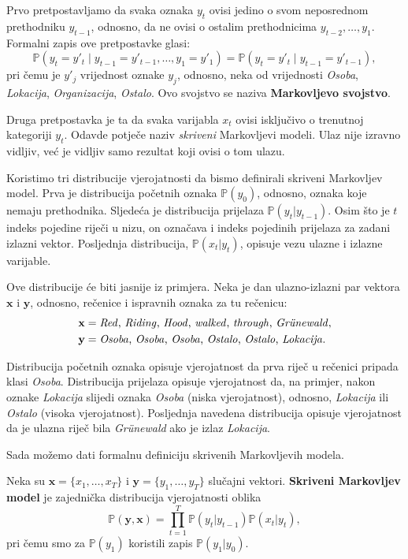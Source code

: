 \documentclass[a4paper,twoside,12pt]{memoir} %
\newcommand{\ti}[1]{\textit{#1\/}}
\newcommand{\tb}{\textbf}
\begin{document}
	Prvo pretpostavljamo da svaka oznaka $y_t$ ovisi jedino o svom neposrednom prethodniku $y_{t-1}$, odnosno, da ne ovisi o ostalim prethodnicima $y_{t-2}, \ldots, y_1$. Formalni zapis ove pretpostavke glasi:
	\begin{equation*}
	\mathbb{P}(y_t=y'_t \mid y_{t-1} = y'_{t-1}, \ldots, y_1 = y'_1) = \mathbb{P}(y_t=y'_t \mid y_{t-1} = y'_{t-1}),
	\end{equation*}
	pri čemu je $y'_j$ vrijednost oznake $y_j$, odnosno, neka od vrijednosti \ti{Osoba}, \ti{Lokacija}, \ti{Organizacija}, \ti{Ostalo}. Ovo svojstvo se naziva \tb{Markovljevo svojstvo}.

	Druga pretpostavka je ta da svaka varijabla $x_t$ ovisi isključivo o trenutnoj kategoriji $y_t$. Odavde potječe naziv \ti{skriveni} Markovljevi modeli. Ulaz nije izravno vidljiv, već je vidljiv samo rezultat koji ovisi o tom ulazu.

	Koristimo tri distribucije vjerojatnosti da bismo definirali skriveni Markovljev model. Prva je distribucija početnih oznaka $\mathbb{P}(y_0)$, odnosno, oznaka koje nemaju prethodnika. Sljedeća je distribucija prijelaza $\mathbb{P}(y_t|y_{t-1})$. Osim što je $t$ indeks pojedine riječi u nizu, on označava i indeks pojedinih prijelaza za zadani izlazni vektor.
	Posljednja distribucija, $\mathbb{P}(x_t|y_t)$, opisuje vezu ulazne i izlazne varijable.

	Ove distribucije će biti jasnije iz primjera. Neka je dan ulazno-izlazni par vektora $\mathbf{x}$ i $\mathbf{y}$, odnosno, rečenice i ispravnih oznaka za tu rečenicu:
	\begin{align*}
	\mathbf{x} &= \text{\ti{Red}, \ti{Riding}, \ti{Hood}, \ti{walked}, \ti{through}, \ti{Grünewald}},\\
	\mathbf{y} &= \text{\ti{Osoba}, \ti{Osoba}, \ti{Osoba}, \ti{Ostalo}, \ti{Ostalo}, \ti{Lokacija}}.
	\end{align*}

	Distribucija početnih oznaka opisuje vjerojatnost da prva riječ u rečenici pripada klasi \ti{Osoba}. Distribucija prijelaza opisuje vjerojatnost da, na primjer, nakon oznake \ti{Lokacija} slijedi oznaka \ti{Osoba} (niska vjerojatnost), odnosno, \ti{Lokacija} ili \ti{Ostalo} (visoka vjerojatnost). Posljednja navedena distribucija opisuje vjerojatnost da je ulazna riječ bila \ti{Grünewald} ako je izlaz \ti{Lokacija}.

	Sada možemo dati formalnu definiciju skrivenih Markovljevih modela.

	\begin{defn}
		Neka su $\mathbf{x} = \{x_1, \ldots, x_T\}$ i $\mathbf{y} = \{y_1, \ldots, y_T\}$ slučajni vektori. \tb{Skriveni Markovljev model} je zajednička distribucija vjerojatnosti oblika
		\begin{equation*}
		\mathbb{P}(\mathbf{y}, \mathbf{x}) = \prod_{t=1}^{T} \mathbb{P}(y_t | y_{t-1}) \mathbb{P}(x_t | y_t),
		\end{equation*}
		pri čemu smo za $\mathbb{P}(y_1)$ koristili zapis $\mathbb{P}(y_1 | y_0)$.
	\end{defn}
\end{document}

